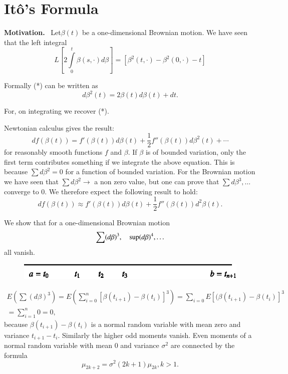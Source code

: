 \chapter{It\^o's Formula}\label{chap16}

\noindent
{\bf Motivation.}~ Let\pageoriginale $\beta(t)$ be a one-dimensional
Brownian motion. We have seen that the left integral
\begin{equation*}
L\left[2\int\limits^{t}_{0}\beta(s,\cdot)d\beta\right]=[\beta^{2}(t,\cdot)-\beta^{2}(0,\cdot)-t]\tag{*}
\end{equation*}

Formally (*) can be written as
$$
d\beta^{2}(t)=2\beta(t)d\beta(t)+dt.
$$

For, on integrating we recover (*).

Newtonian calculus gives the result:
$$
df(\beta(t))=f'(\beta(t))d\beta(t)+\frac{1}{2}f''(\beta(t))d\beta^{2}(t)+\cdots 
$$
for reasonably smooth functions $f$ and $\beta$. If $\beta$ is of
bounded variation, only the first term contributes something if we
integrate the above equation. This is because $\sum d\beta^{2}=0$ for
a function of bounded variation. For the Brownian motion we have seen
that $\sum d\beta^{2}\to$ a non zero value, but one can prove that
$\sum d\beta^{3},\ldots$ converge to $0$. We therefore expect the
following result to hold:
$$
df(\beta(t))\approx
f'(\beta(t))d\beta(t)+\frac{1}{2}f''(\beta(t))d^{2}\beta(t). 
$$

We show that for a one-dimensional Brownian motion
$$
\sum (d\beta)^{3},\quad \sup(d\beta)^{4},\ldots
$$ 
all vanish.
\begin{figure}[H]
\centering
\includegraphics{figure/fig12.eps}
\end{figure}

\begin{gather*}
E(\sum(d\beta)^{3})=E\left(\sum\limits^{n}_{i=0}[\beta(t_{i+1})-\beta(t_{i})]^{3}\right)=\sum\limits_{i=0}E[(\beta(t_{i+1})-\beta(t_{i})]^{3}\\
=\sum^{n}_{i=1}0=0,
\end{gather*}\pageoriginale
because $\beta(t_{i+1})-\beta(t_{i})$ is a normal random variable with
mean zero and variance $t_{i+1}-t_{i}$. Similarly the higher odd
moments vanish. Even moments of a normal random variable with mean $0$
and variance $\sigma^{2}$ are connected by the formula
$$
\mu_{2k+2}=\sigma^{2}(2k+1)\mu_{2k},k>1.
$$

